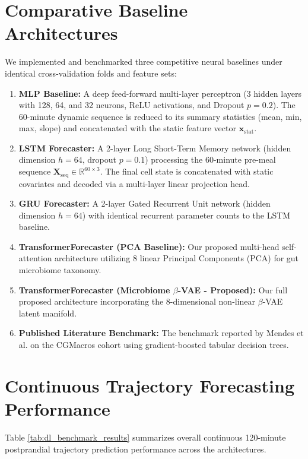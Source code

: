 \section{Comparative Baseline Architectures}
We implemented and benchmarked three competitive neural baselines under identical cross-validation folds and feature sets:
\begin{enumerate}
    \item \textbf{MLP Baseline:} A deep feed-forward multi-layer perceptron (3 hidden layers with 128, 64, and 32 neurons, ReLU activations, and Dropout $p=0.2$). The 60-minute dynamic sequence is reduced to its summary statistics (mean, min, max, slope) and concatenated with the static feature vector $\mathbf{x}_{\text{stat}}$.
    \item \textbf{LSTM Forecaster:} A 2-layer Long Short-Term Memory network (hidden dimension $h = 64$, dropout $p=0.1$) processing the 60-minute pre-meal sequence $\mathbf{X}_{\text{seq}} \in \mathbb{R}^{60 \times 3}$. The final cell state is concatenated with static covariates and decoded via a multi-layer linear projection head.
    \item \textbf{GRU Forecaster:} A 2-layer Gated Recurrent Unit network (hidden dimension $h = 64$) with identical recurrent parameter counts to the LSTM baseline.
    \item \textbf{TransformerForecaster (PCA Baseline):} Our proposed multi-head self-attention architecture utilizing 8 linear Principal Components (PCA) for gut microbiome taxonomy.
    \item \textbf{TransformerForecaster (Microbiome $\beta$-VAE - Proposed):} Our full proposed architecture incorporating the 8-dimensional non-linear $\beta$-VAE latent manifold.
    \item \textbf{Published Literature Benchmark:} The benchmark reported by Mendes et al. \cite{mendes2024cgmacros} on the CGMacros cohort using gradient-boosted tabular decision trees.
\end{enumerate}

\section{Continuous Trajectory Forecasting Performance}
Table \ref{tab:dl_benchmark_results} summarizes overall continuous 120-minute postprandial trajectory prediction performance across the architectures.

